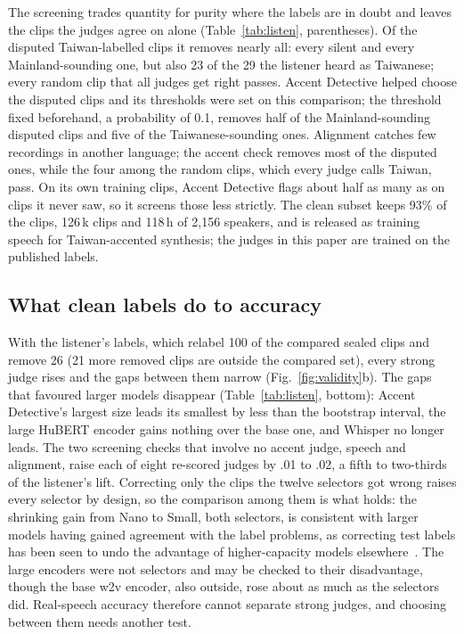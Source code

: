 \documentclass{Interspeech}
\begin{document}
The screening trades quantity for purity where the labels are in doubt and leaves the clips the judges agree on alone (Table~\ref{tab:listen}, parentheses). Of the disputed Taiwan-labelled clips it removes nearly all: every silent and every Mainland-sounding one, but also 23 of the 29 the listener heard as Taiwanese; every random clip that all judges get right passes. Accent Detective helped choose the disputed clips and its thresholds were set on this comparison; the threshold fixed beforehand, a probability of 0.1, removes half of the Mainland-sounding disputed clips and five of the Taiwanese-sounding ones. Alignment catches few recordings in another language; the accent check removes most of the disputed ones, while the four among the random clips, which every judge calls Taiwan, pass. On its own training clips, Accent Detective flags about half as many as on clips it never saw, so it screens those less strictly. The clean subset keeps 93\% of the clips, 126\,k clips and 118\,h of 2,156 speakers, and is released as training speech for Taiwan-accented synthesis; the judges in this paper are trained on the published labels.

\subsection{What clean labels do to accuracy}
\label{sec:accuracy}

With the listener's labels, which relabel 100 of the compared sealed clips and remove 26 (21 more removed clips are outside the compared set), every strong judge rises and the gaps between them narrow (Fig.~\ref{fig:validity}b). The gaps that favoured larger models disappear (Table~\ref{tab:listen}, bottom): Accent Detective's largest size leads its smallest by less than the bootstrap interval, the large HuBERT encoder gains nothing over the base one, and Whisper no longer leads. The two screening checks that involve no accent judge, speech and alignment, raise each of eight re-scored judges by .01 to .02, a fifth to two-thirds of the listener's lift. Correcting only the clips the twelve selectors got wrong raises every selector by design, so the comparison among them is what holds: the shrinking gain from Nano to Small, both selectors, is consistent with larger models having gained agreement with the label problems, as correcting test labels has been seen to undo the advantage of higher-capacity models elsewhere~\cite{northcutt2021pervasive}. The large encoders were not selectors and may be checked to their disadvantage, though the base w2v encoder, also outside, rose about as much as the selectors did. Real-speech accuracy therefore cannot separate strong judges, and choosing between them needs another test.
\end{document}
